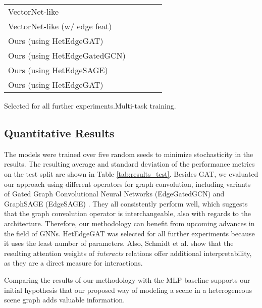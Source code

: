 \documentclass[letterpaper, 10 pt, journal, twoside]{IEEEtran}
\begin{document}
\begin{table}[!t]
\begin{tabularx}{\columnwidth}{Xllll}
		VectorNet-like \cite{Gao2020}                &           &           &           &           \\
		VectorNet-like (w/ edge feat) \cite{Gao2020} &           &           &           &           \\ \midrule
		Ours (using HetEdgeGAT)\footnotemark         &  &  &           &           \\
		Ours (using HetEdgeGatedGCN)                 &           &           &  &  \\
		Ours (using HetEdgeSAGE)                     &           &           &           &           \\
		Ours (using HetEdgeGAT)                  &           &           &           &           \\ \bottomrule
	\end{tabularx}
	\begin{flushleft}
	\footnotemark[1]Selected for all further experiments.\quad Multi-task training.
	\end{flushleft}
	\vspace{-0.3cm}
\end{table}
 
\subsection{Quantitative Results}
The models were trained over five random seeds to minimize stochasticity in the results.
The resulting average and standard deviation of the performance metrics on the test split are shown in Table \ref{tab:results_test}.
Besides GAT, we evaluated our approach using different operators for graph convolution, including variants of Gated Graph Convolutional Neural Networks (EdgeGatedGCN) \cite{Bresson2018_ARXIV} and GraphSAGE (EdgeSAGE) \cite{Hamilton2017}.
They all consistently perform well, which suggests that the graph convolution operator is interchangeable, also with regards to the architecture.
Therefore, our methodology can benefit from upcoming advances in the field of GNNs.
HetEdgeGAT was selected for all further experiments because it uses the least number of parameters.
Also, Schmidt et al. \cite{Schmidt2022} show that the resulting attention weights of \textit{interacts} relations offer additional interpretability, as they are a direct measure for interactions.

Comparing the results of our methodology with the MLP baseline supports our initial hypothesis that our proposed way of modeling a scene in a heterogeneous scene graph adds valuable information.
\end{document}
